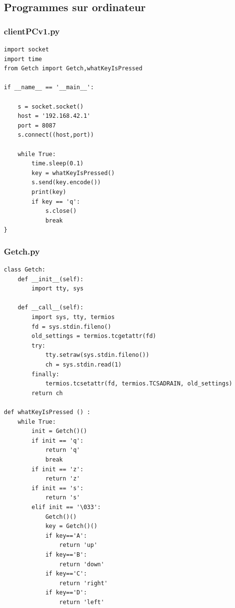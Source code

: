 \documentclass[twoside,twocolumn, 16pt]{article}
\begin{document}
\subsection{Programmes sur ordinateur}
\subsubsection{clientPCv1.py}
\begin{lstlisting}
import socket
import time
from Getch import Getch,whatKeyIsPressed

if __name__ == '__main__':
	
	s = socket.socket()
	host = '192.168.42.1'
	port = 8087
	s.connect((host,port))
	
	while True:
		time.sleep(0.1)
		key = whatKeyIsPressed()
		s.send(key.encode())
		print(key)
		if key == 'q':
			s.close()
			break
}
\end{lstlisting}

\subsubsection{Getch.py}

\begin{lstlisting}
class Getch:
	def __init__(self):
		import tty, sys

	def __call__(self):
		import sys, tty, termios
		fd = sys.stdin.fileno()
		old_settings = termios.tcgetattr(fd)
		try:
			tty.setraw(sys.stdin.fileno())
			ch = sys.stdin.read(1)
		finally:
			termios.tcsetattr(fd, termios.TCSADRAIN, old_settings)
		return ch

def whatKeyIsPressed () :
	while True:
		init = Getch()()
		if init == 'q':
			return 'q'
			break
		if init == 'z':
			return 'z'
		if init == 's':
			return 's'
		elif init == '\033':
			Getch()()
			key = Getch()()
			if key=='A':
				return 'up'
			if key=='B':
				return 'down'
			if key=='C':
				return 'right'
			if key=='D':
				return 'left'
\end{lstlisting}
\end{document}
